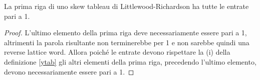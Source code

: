 \begin{oss}
La prima riga di uno skew tableau di Littlewood-Richardson ha tutte le
entrate pari a 1.
\begin{proof}
L'ultimo elemento della prima riga deve necessariamente essere pari a
1, altrimenti la parola risultante non terminerebbe per 1 e non
sarebbe quindi una reverse lattice word. Allora poich\'e le entrate
devono rispettare la (i) della definizione \ref{ytab} gli altri
elementi della prima riga, precedendo l'ultimo elemento, devono
necessariamente essere pari a 1.
\end{proof}
\end{oss}
